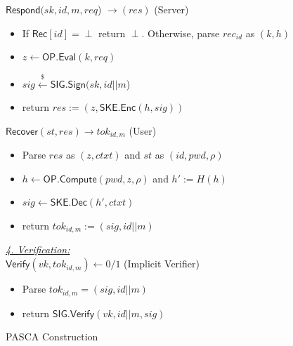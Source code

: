 \documentclass[conference]{IEEEtran}
\newcommand{\sk}{sk}
\newcommand{\vk}{vk}
\newcommand{\uid}{id}
\begin{document}
\begin{figure}
\begin{multicols}{2}

$\mathsf{Respond}(\sk, \uid, m ,req$) $\rightarrow (res)$ \hspace*{\fill} (Server)
\begin{itemize}
    \item If $\mathsf{Rec}[\uid] = \perp$ return $\perp$. Otherwise, parse $rec_{\uid}$ as $(k,h)$
    \item $z \leftarrow \mathsf{OP.Eval}(k, req)$
    \item $sig \xleftarrow{\$} \mathsf{SIG.Sign}(\sk,\uid||m$)
    \item return $res := (z, \mathsf{SKE.Enc}(h,sig))$
\end{itemize}

$\mathsf{Recover}(st,res) \rightarrow tok_{\uid,m}$ \hspace*{\fill} (User)
\begin{itemize}
    \item Parse $res$ as $(z,ctxt)$ and $st$ as $(\uid, pwd, \rho)$
    \item $h \leftarrow \mathsf{OP.Compute}(pwd, z,\rho)$ and $h' := H(h)$
    \item $sig \leftarrow \mathsf{SKE.Dec}(h',ctxt)$
    \item return $tok_{\uid,m} := (sig,\uid||m)$
\end{itemize}

\underline{{\em4. Verification:}}\\
$\mathsf{Verify}(vk,tok_{\uid,m}) \leftarrow 0/1$ \hspace*{\fill} (Implicit Verifier)
\begin{itemize}
    \item Parse $tok_{\uid,m} = (sig,\uid||m)$
    \item return $\mathsf{SIG.Verify}(\vk,\uid||m,sig)$ 
\end{itemize}
\end{multicols}
\caption{PASCA Construction}
\label{pasca-construction}
\end{figure}

%
%
\end{document}
